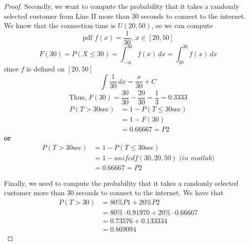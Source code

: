 \documentclass{article}
\begin{document}
\begin{proof}
Secondly, we want to compute the probability that it takes a randomly selected customer from Line II more than 30 seconds to connect to the internet. We know that the connection time is $U(20, 50)$, so we can compute
\begin{equation*}
    \text{pdf } f(x) = \frac{1}{30} \text{, } x \in [20, 50] 
\end{equation*}
\begin{equation*}
        F(30) = P(X \leq 30) = \int_{-\infty}^{30} f(x)\,dx = \int_{20}^{30} f(x)\,dx
\end{equation*}
since $f$ is defined on $[20, 50]$
\begin{equation*}
    \int \frac{1}{30} \,dx = \frac{x}{30} + C
\end{equation*}
\begin{equation*}
    \text{Thus, } F(30) = \frac{30}{30} - \frac{20}{30} = \frac{1}{3} = 0.3333 
\end{equation*}
\begin{equation*}
\begin{split}
    P(T > 30 \text{sec}) &= 1 - P(T \leq 30 \text{sec}) \\
    &= 1 - F(30)\\
    &= 0.66667 = P2
\end{split}
\end{equation*}
\textbf{or}
\begin{equation}
\begin{split}
    P(T > 30 \text{sec}) &= 1 - P(T \leq 30 \text{sec}) \\
    &= 1 - unifcdf(30, 20, 50) \textit{ (in matlab)} \\
    &= 0.66667 = P2
\end{split}
\end{equation}

Finally, we need to compute the probability that it takes a randomly selected customer more than 30 seconds to connect to the internet. We have that
\begin{equation*}
    \begin{split}
        P(T > 30) &= 80\% P1 + 20\% P2 \\
        &= 80\% \cdot 0.91970 + 20\% \cdot 0.66667 \\
        &= 0.73576 + 0.133334 \\
        &= 0.869094
    \end{split}
\end{equation*}
\end{proof}
\end{document}
